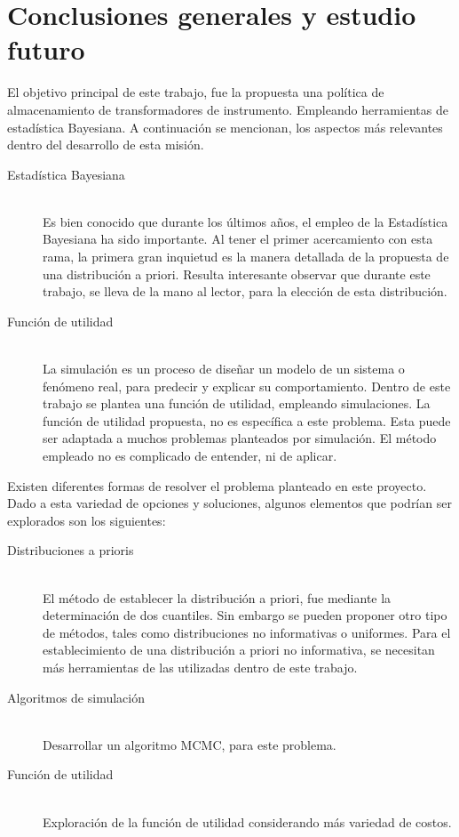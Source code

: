 
\chapter{Conclusiones generales y estudio futuro}

\noindent El objetivo principal de este trabajo, fue la propuesta una pol\'itica de almacenamiento de transformadores de instrumento. Empleando herramientas de estad\'istica Bayesiana. A continuaci\'on se mencionan, los aspectos m\'as relevantes dentro del desarrollo de esta misi\'on.

\begin{description}
\item[Estad\'istica Bayesiana] \hfill \\
Es bien conocido que durante los \'ultimos a\~nos, el empleo de la Estad\'istica Bayesiana ha sido importante. Al tener el primer acercamiento con esta rama, la primera gran inquietud es la manera detallada de la propuesta de una distribuci\'on a priori. Resulta interesante observar que durante este trabajo, se lleva de la mano al lector,  para la elecci\'on de esta distribuci\'on. %

\item[Funci\'on de utilidad] \hfill \\
La simulaci\'on es un  proceso de dise\~nar un modelo de un sistema o fen\'omeno real, para predecir y explicar su comportamiento. Dentro de este trabajo se plantea una funci\'on de utilidad, empleando simulaciones. La funci\'on de utilidad propuesta, no es espec\'ifica a este problema. Esta puede ser adaptada a muchos problemas planteados por simulaci\'on. El m\'etodo empleado no es complicado de entender, ni de aplicar.
\end{description}

\noindent Existen diferentes formas de resolver el problema planteado en este proyecto. Dado a esta variedad de opciones y soluciones,  algunos elementos que podr\'ian ser explorados son los siguientes:

\begin{description}
\item[Distribuciones a prioris] \hfill \\
El m\'etodo de establecer la distribuci\'on a priori, fue mediante la determinaci\'on de dos cuantiles. Sin embargo se pueden proponer otro tipo de m\'etodos, tales como distribuciones no informativas o uniformes. Para el establecimiento de una distribuci\'on a priori no informativa, se necesitan m\'as herramientas de las utilizadas dentro de este trabajo.

\item[Algoritmos de simulaci\'on] \hfill \\
Desarrollar un algoritmo MCMC, para este problema.

\item[Funci\'on de utilidad] \hfill \\
Exploraci\'on de la funci\'on de utilidad considerando m\'as variedad de  costos.

\end{description}



